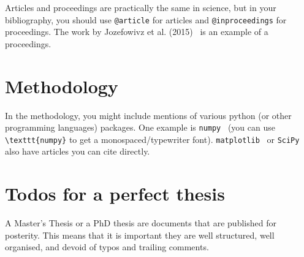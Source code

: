 \documentclass[a4paper,11pt,masters,en,listoffigures,listoftables]{NMBU}
\begin{document}
Articles and proceedings are practically the same in science, but in your bibliography, you should use \verb|@article| for articles and \verb|@inproceedings| for proceedings. The work by Jozefowivz et al. (2015)~\cite{Jozefowicz2015empirical} is an example of a proceedings.

\clearpage
\section{Methodology}

In the methodology, you might include mentions of various python (or other programming languages) packages. One example is \texttt{numpy}~\cite{NumPy}  (you can use \verb|\texttt{numpy}| to get a monospaced/typewriter font). \texttt{matplotlib}~\cite{Matplotlib} or \texttt{SciPy}~\cite{SciPy} also have articles you can cite directly.

\clearpage

\section*{Todos for a perfect thesis}
A Master's Thesis or a PhD thesis are documents that are published for posterity. This means that it is important they are well structured, well organised, and devoid of typos and trailing comments.
\end{document}
